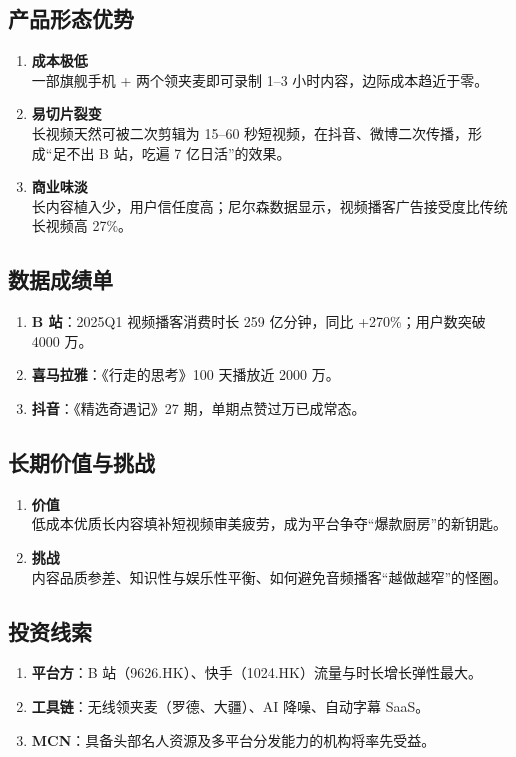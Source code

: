 \subsection{产品形态优势}
\begin{enumerate}[leftmargin=*, nosep]
  \item \textbf{成本极低} \\
  一部旗舰手机 + 两个领夹麦即可录制 1–3 小时内容，边际成本趋近于零。
  \item \textbf{易切片裂变} \\
  长视频天然可被二次剪辑为 15–60 秒短视频，在抖音、微博二次传播，形成“足不出 B 站，吃遍 7 亿日活”的效果。
  \item \textbf{商业味淡} \\
  长内容植入少，用户信任度高；尼尔森数据显示，视频播客广告接受度比传统长视频高 27\%。
\end{enumerate}

\subsection{数据成绩单}
\begin{enumerate}[leftmargin=*, nosep]
  \item \textbf{B 站}：2025Q1 视频播客消费时长 259 亿分钟，同比 +270\%；用户数突破 4000 万。
  \item \textbf{喜马拉雅}：《行走的思考》100 天播放近 2000 万。
  \item \textbf{抖音}：《精选奇遇记》27 期，单期点赞过万已成常态。
\end{enumerate}

\subsection{长期价值与挑战}
\begin{enumerate}[leftmargin=*, nosep]
  \item \textbf{价值} \\
  低成本优质长内容填补短视频审美疲劳，成为平台争夺“爆款厨房”的新钥匙。
  \item \textbf{挑战} \\
  内容品质参差、知识性与娱乐性平衡、如何避免音频播客“越做越窄”的怪圈。
\end{enumerate}

\subsection{投资线索}
\begin{enumerate}[leftmargin=*, nosep]
  \item \textbf{平台方}：B 站（9626.HK）、快手（1024.HK）流量与时长增长弹性最大。  
  \item \textbf{工具链}：无线领夹麦（罗德、大疆）、AI 降噪、自动字幕 SaaS。  
  \item \textbf{MCN}：具备头部名人资源及多平台分发能力的机构将率先受益。
\end{enumerate}


